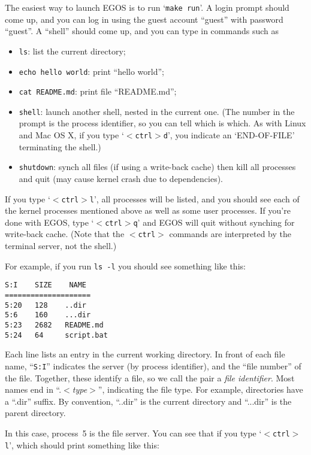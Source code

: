 \documentclass{article}
\begin{document}
The easiest way to launch EGOS is to run `\texttt{make run}'.
A login prompt should come up, and you can log in using the guest
account ``guest'' with password ``guest''.
A ``shell'' should come up, and you can type in commands such as
\begin{itemize}
\item \texttt{ls}: list the current directory;
\item \texttt{echo hello world}: print ``hello world'';
\item \texttt{cat README.md}: print file ``README.md'';
\item \texttt{shell}: launch another shell, nested in the current one.
(The number in the prompt is the process identifier, so you can tell
which is which.  As with Linux and Mac OS X, if you type
`\texttt{$<$ctrl$>$d}', you indicate an `END-OF-FILE' terminating the shell.)
\item \texttt{shutdown}: synch all files (if using a write-back cache) then kill all processes and quit (may cause kernel crash due to dependencies).
\end{itemize}

If you type `\texttt{$<$ctrl$>$l}', all processes will be listed,
and you should see each of the kernel processes mentioned above  as well as
some user processes.  If you're done with EGOS, type `\texttt{$<$ctrl$>$q}'
and EGOS will quit without synching for write-back cache.
(Note that the \texttt{$<$ctrl$>$} commands are
interpreted by the terminal server, not the shell.)

For example, if you run \texttt{ls -l} you should see something like this:

\begin{verbatim}
S:I    SIZE    NAME
====================
5:20   128    ..dir
5:6    160    ...dir
5:23   2682   README.md
5:24   64     script.bat
\end{verbatim}

Each line lists an entry in the current working directory.  In front of
each file name, ``\texttt{S:I}'' indicates the server (by process
identifier), and the ``file number'' of the file.  Together, these
identify a file, so we call the pair a \emph{file identifier}.
Most names end in ``.$<$\emph{type}$>$'', indicating the file type.
For example, directories have a ``.dir'' suffix.
By convention, ``..dir'' is the current directory and ``...dir'' is the
parent directory.

In this case, process~5 is the file server.  You can see that if you
type `\texttt{$<$ctrl$>$l}', which should print something like this:
\end{document}
